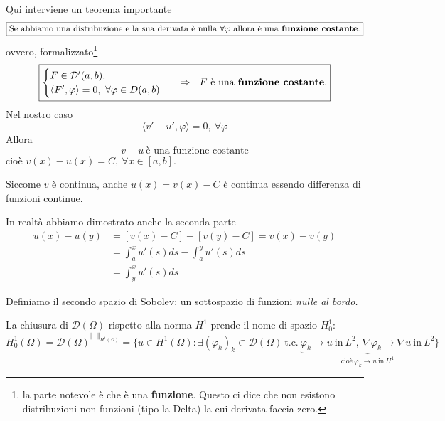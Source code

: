 \documentclass[10pt,a4paper,twoside,openright]{book}
\begin{document}
\begin{dimostrazione}
Qui interviene un teorema importante
\begin{equation*}
	\boxed{\text{Se abbiamo una distribuzione e la sua derivata è nulla} \ \forall \varphi \ \text{allora è una \textbf{funzione costante}.}}
\end{equation*}
ovvero, formalizzato\footnote{la parte notevole è che è una \textbf{funzione}. Questo ci dice che non esistono distribuzioni-non-funzioni (tipo la Delta) la cui derivata faccia zero.}
\begin{equation*}
	\boxed{\begin{cases}
		F\in \mathcal{D} '( a,b) ,\\
		\langle F',\varphi \rangle =0,\ \forall \varphi \in D( a,b)
		\end{cases} \ \ \Rightarrow \ \ F\ \text{è una \textbf{funzione costante}.}}
\end{equation*}
Nel nostro caso
\begin{equation*}
	\langle v'-u',\varphi \rangle =0,\ \forall \varphi 
\end{equation*}
Allora
\begin{equation*}
	v-u\ \text{è una funzione costante}
\end{equation*}
cioè $v( x) -u( x) =C,\ \forall x\in [ a,b]$.

Siccome $v$ è continua, anche $u( x) =v( x) -C$ è continua essendo differenza di funzioni continue.

In realtà abbiamo dimostrato anche la seconda parte
\begin{align*}
	u( x) -u( y) & =[ v( x) -C] -[ v( y) -C] =v( x) -v( y)          \\
	             & =\int ^{x}_{a} u'( s) ds-\int ^{y}_{a} u'( s) ds \\
	             & =\int ^{x}_{y} u'( s) ds                         
\end{align*}
\end{dimostrazione}
Definiamo il secondo spazio di Sobolev: un sottospazio di funzioni \textit{nulle al bordo.}
\begin{definition}
	La chiusura di $\mathcal{D}( \Omega )$ rispetto alla norma $H^{1}$ prende il nome di spazio $H^{1}_{0}$:
	\begin{equation*}
		H^{1}_{0}( \Omega ) =\overline{\mathcal{D}( \Omega )}^{\Vert \cdotp \Vert _{H^{1}( \Omega )}}                                                                                                                                                                                                                             
		                    =\bigg\{u\in H^{1}( \Omega ) :\exists ( \varphi _{k})_{k} \subset \mathcal{D}( \Omega ) \ \text{t.c.} \ \underbrace{\varphi _{k}\rightarrow u\ \text{in} \ L^{2} ,\ \nabla \varphi _{k}\rightarrow \nabla u\ \text{in} \ L^{2}}_{\text{cioè} \ \varphi _{k}\rightarrow u\ \text{in} \ H^{1}}\bigg\} 
	\end{equation*}
\end{definition}
\end{document}

